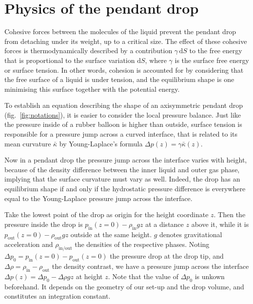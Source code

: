 \documentclass[fleqn]{scrartcl}
\newcommand{\ud}{\mathrm{d}}%
\begin{document}
\section{Physics of the pendant drop}
\label{sec:theory}

Cohesive forces between the molecules of the liquid prevent the
pendant drop from detaching under its weight, up to a critical size.
The effect of these cohesive forces is thermodynamically described by
a contribution $\gamma\, \ud S$ to the free energy that is
proportional to the surface variation $\ud S$, where $\gamma$ is the
surface free energy or surface tension. In other words, cohesion is
accounted for by considering that the free surface of a liquid is
under tension, and the equilibrium shape is one minimising this
surface together with the potential energy.

To establish an equation describing the shape of an axisymmetric
pendant drop (fig.~\ref{fig:notations}), it is easier to consider the
local pressure balance. Just like the pressure inside of a rubber
balloon is higher than outside, surface tension is responsible for a
pressure jump across a curved interface, that is related to its mean
curvature $\bar\kappa$ by Young-Laplace's formula $\Delta\! p(z) =
\gamma \bar\kappa(z)$.

Now in a pendant drop the pressure jump across the interface varies
with height, because of the density difference between the inner
liquid and outer gas phase, implying that the surface curvature must
vary as well. Indeed, the drop has an equilibrium shape if and only if
the hydrostatic pressure difference is everywhere equal to the
Young-Laplace pressure jump across the interface.

Take the lowest point of the drop as origin for the height coordinate
$z$. Then the pressure inside the drop is $p_{\mathrm{in}}(z=0) -
\rho_{\mathrm{in}} g z$ at a distance $z$ above it, while it is
$p_{\mathrm{out}}(z=0) - \rho_{\mathrm{out}} g z$ outside at the same
height. $g$ denotes gravitational acceleration and
$\rho_{\mathrm{in/out}}$ the densities of the respective phases.
Noting $\Delta\! p_0 = p_{\mathrm{in}}(z=0) - p_{\mathrm{out}}(z=0)$
the pressure drop at the drop tip, and $\Delta\!\rho =
\rho_{\mathrm{in}} - \rho_{\mathrm{out}}$ the density contrast, we
have a pressure jump across the interface $\Delta\! p(z) = \Delta\!
p_0 - \Delta\!\rho g z$ at height $z$. Note that the value of
$\Delta\! p_0$ is unkown beforehand. It depends on the geometry of our
set-up and the drop volume, and constitutes an integration constant.
\end{document}
